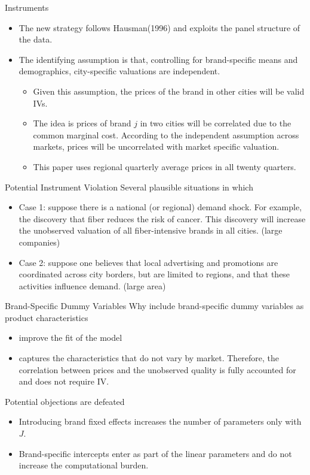 \documentclass{beamer}
\begin{document}
\begin{frame}{Instruments}
	\begin{itemize}
		\item The new strategy follows Hausman(1996) and exploits the panel structure of the data.
		\item The identifying assumption is that, controlling for brand-specific means and demographics, city-specific valuations are independent.
		\begin{itemize}
			\item Given this assumption, the prices of the brand in other cities will be valid IVs.
			\item The idea is prices of brand $j$ in two cities will be correlated due to the common marginal cost. According to the independent assumption across markets, prices will be uncorrelated with market specific valuation.
			\item This paper uses regional quarterly average prices in all twenty quarters.
		\end{itemize}
	\end{itemize}
\end{frame}
\begin{frame}{Potential Instrument Violation}
	Several plausible situations in which
	\begin{itemize}
		\item Case 1: suppose there is a national (or regional) demand shock. For example, the discovery that fiber reduces the risk of cancer. This discovery will increase the unobserved valuation of all fiber-intensive brands in all cities. (large companies)
		\item Case 2: suppose one believes that local advertising and promotions are coordinated across city borders, but are limited to regions, and that these activities influence demand. (large area)
	\end{itemize}
\end{frame}
\begin{frame}{Brand-Specific Dummy Variables}
	Why include brand-specific dummy variables as product characteristics
	\begin{itemize}
		\item improve the fit of the model
		\item captures the characteristics that do not vary by market. Therefore, the correlation between prices and the unobserved quality is fully accounted for and does not require IV.
	\end{itemize}

	Potential objections are defeated
	\begin{itemize}
		\item Introducing brand fixed effects increases the number of parameters only with $J$.
		\item Brand-specific intercepts enter as part of the linear parameters and do not increase the computational burden.
	\end{itemize}
\end{frame}
\end{document}

